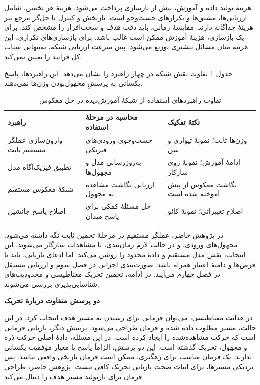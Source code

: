 هزینهٔ تولید داده و آموزش، پیش از بازسازی پرداخت می‌شود.
هزینهٔ هر تخمین، شامل ارزیابی‌ها، مشتق‌ها و تکرارهای جست‌وجو است.
بازپخش و کنترل با حل‌گر مرجع نیز هزینهٔ جداگانه دارند.
مقایسهٔ زمانی، باید دقت هدف و سخت‌افزار را مشخص کند.
برای یک بازسازی، هزینهٔ آموزش ممکن است غالب باشد.
برای بازسازی‌های تکراری، این هزینه میان مسائل بیشتری توزیع می‌شود.
پس سرعت ارزیابی شبکه، به‌تنهایی شتاب کل فرایند را تعیین نمی‌کند.

جدول \ref{tab:lit-inverse-operator-strategies} تفاوت نقش شبکه در چهار راهبرد را نشان می‌دهد.
این راهبردها، پاسخ یکسانی به پرسشِ مجهول‌بودن وزن‌ها نمی‌دهند.

\begin{table}[htbp]
\centering
\small
\caption{تفاوت راهبردهای استفاده از شبکهٔ آموزش‌دیده در حل معکوس}
\label{tab:lit-inverse-operator-strategies}
\begin{tabular}{p{}p{}p{}}
\hline
راهبرد & محاسبه در مرحلهٔ استفاده & نکتهٔ تفکیک \\
\hline
وارون‌سازی عملگر مستقیم ثابت
& جست‌وجوی ورودی‌های فیزیکی
& وزن‌ها ثابت؛ نمونهٔ تیواری و سن \cite{Tiwari2026BayesianCFD} \\
تطبیق فیزیک‌آگاه مدل
& به‌روزرسانی مدل و مجهول‌ها
& ادامهٔ آموزش؛ نمونهٔ روی سارکار \cite{RoySarkar2026HiddenPhysics} \\
شبکهٔ معکوس مستقیم
& ارزیابی نگاشت مشاهده به مجهول
& نگاشت معکوس از پیش آموخته شده است \\
اصلاح پاسخ جانشین
& حل مسئلهٔ کمکی برای پاسخ میدان
& اصلاح تغییراتی؛ نمونهٔ کائو \cite{Cao2023ResidualCorrection} \\
\hline
\end{tabular}
\end{table}

در پژوهش حاضر، عملگر مستقیم در مرحلهٔ تخمین ثابت نگه داشته می‌شود.
مجهول‌های ورودی، و در حالت لازم زمان‌بندی، با مشاهدات سازگار می‌شوند.
این انتخاب، نقش مدل مستقیم و دادهٔ محدود را روشن می‌کند.
اما ادعای بازیابی، باید با فرض‌ها و دامنهٔ اعتبار همراه باشد.
صورت‌بندی اجرایی در فصل سوم و ارزیابی مستقل در فصل چهارم می‌آیند.
در ادامه، تخمین تحریک مغناطیسی و محدودیت‌های شناسایی‌پذیری بررسی می‌شوند.

\label{sec:lit-magnetic-inverse-tracking}

\textbf{دو پرسش متفاوت دربارهٔ تحریک}

در هدایت مغناطیسی، می‌توان فرمانی برای رسیدن به مسیر هدف انتخاب کرد.
در این حالت، مسیر مطلوب داده شده و فرمان طراحی می‌شود.
پرسش دیگر، بازیابی فرمانی است که حرکت مشاهده‌شده را ایجاد کرده است.
در این مسئله، دادهٔ اصلی حرکت ذره و مجهول، تحریک گذشته است.
این دو پرسش، الزاماً پاسخ یا معیار موفقیت یکسانی ندارند.
یک فرمان مناسب برای رهگیری، ممکن است فرمان تاریخی واقعی نباشد.
پس نزدیکی مسیرها، برای اثبات صحت بازیابی تحریک کافی نیست.
پژوهش حاضر، طراحی فرمان برای بازتولید مسیر هدف را دنبال می‌کند.

